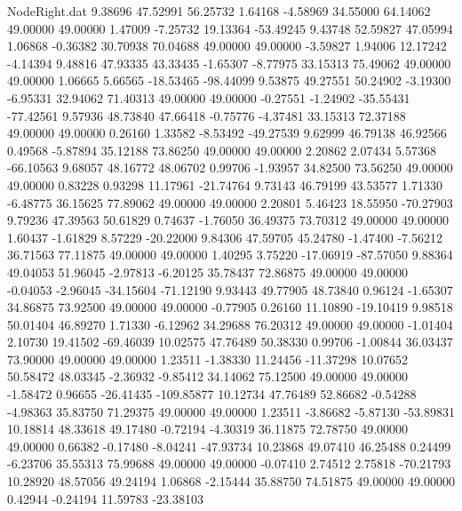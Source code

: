 \begin{filecontents}{NodeRight.dat}
   9.38696   47.52991   56.25732     1.64168   -4.58969   34.55000   64.14062   49.00000   49.00000    1.47009   -7.25732   19.13364  -53.49245
   9.43748   52.59827   47.05994     1.06868   -0.36382   30.70938   70.04688   49.00000   49.00000   -3.59827    1.94006   12.17242   -4.14394
   9.48816   47.93335   43.33435    -1.65307   -8.77975   33.15313   75.49062   49.00000   49.00000    1.06665    5.66565  -18.53465  -98.44099
   9.53875   49.27551   50.24902    -3.19300   -6.95331   32.94062   71.40313   49.00000   49.00000   -0.27551   -1.24902  -35.55431  -77.42561
   9.57936   48.73840   47.66418    -0.75776   -4.37481   33.15313   72.37188   49.00000   49.00000    0.26160    1.33582   -8.53492  -49.27539
   9.62999   46.79138   46.92566     0.49568   -5.87894   35.12188   73.86250   49.00000   49.00000    2.20862    2.07434    5.57368  -66.10563
   9.68057   48.16772   48.06702     0.99706   -1.93957   34.82500   73.56250   49.00000   49.00000    0.83228    0.93298   11.17961  -21.74764
   9.73143   46.79199   43.53577     1.71330   -6.48775   36.15625   77.89062   49.00000   49.00000    2.20801    5.46423   18.55950  -70.27903
   9.79236   47.39563   50.61829     0.74637   -1.76050   36.49375   73.70312   49.00000   49.00000    1.60437   -1.61829    8.57229  -20.22000
   9.84306   47.59705   45.24780    -1.47400   -7.56212   36.71563   77.11875   49.00000   49.00000    1.40295    3.75220  -17.06919  -87.57050
   9.88364   49.04053   51.96045    -2.97813   -6.20125   35.78437   72.86875   49.00000   49.00000   -0.04053   -2.96045  -34.15604  -71.12190
   9.93443   49.77905   48.73840     0.96124   -1.65307   34.86875   73.92500   49.00000   49.00000   -0.77905    0.26160   11.10890  -19.10419
   9.98518   50.01404   46.89270     1.71330   -6.12962   34.29688   76.20312   49.00000   49.00000   -1.01404    2.10730   19.41502  -69.46039
  10.02575   47.76489   50.38330     0.99706   -1.00844   36.03437   73.90000   49.00000   49.00000    1.23511   -1.38330   11.24456  -11.37298
  10.07652   50.58472   48.03345    -2.36932   -9.85412   34.14062   75.12500   49.00000   49.00000   -1.58472    0.96655  -26.41435 -109.85877
  10.12734   47.76489   52.86682    -0.54288   -4.98363   35.83750   71.29375   49.00000   49.00000    1.23511   -3.86682   -5.87130  -53.89831
  10.18814   48.33618   49.17480    -0.72194   -4.30319   36.11875   72.78750   49.00000   49.00000    0.66382   -0.17480   -8.04241  -47.93734
  10.23868   49.07410   46.25488     0.24499   -6.23706   35.55313   75.99688   49.00000   49.00000   -0.07410    2.74512    2.75818  -70.21793
  10.28920   48.57056   49.24194     1.06868   -2.15444   35.88750   74.51875   49.00000   49.00000    0.42944   -0.24194   11.59783  -23.38103

\end{filecontents}
